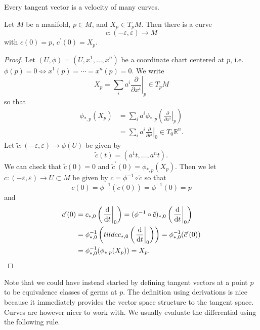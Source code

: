 Every tangent vector is a velocity of many curves.
\begin{lemma}
Let $M$ be a manifold, $p \in M$, and $X_p \in T_pM$.
Then there is a curve
$$
c: (-\varepsilon, \varepsilon) \to M
$$
with $c(0) = p$, $c^\prime(0) = X_p$.
\end{lemma}

\begin{proof}
Let $(U, \phi) = (U, x^1, \dots, x^n)$ be a coordinate chart centered
at $p$, i.e. $\phi(p) = 0 \iff x^1(p) = \cdots = x^n(p) = 0$. We write
$$
  X_p
= \sum_i
    a^i \left.\frac{\partial}{\partial x^i}\right|_p
\in T_p M
$$
so that
\begin{align*}
   \phi_{\ast, p}(X_p)
&= \sum_i
     a^i \phi_{\ast, p}
     \left(
       \left.\frac{\partial}{\partial x^i}\right|_p
     \right) \\
&= \sum_i
     a^i
     \left.\frac{\partial}{\partial r^i}\right|_0
\in T_0 \mathbb{R}^n.
\end{align*}
Let $\tilde{c} : (-\varepsilon, \varepsilon) \to \phi(U)$ be given by
$$
  \tilde{c}(t)
= (a^1 t, \dots, a^n t).
$$
We can check that $\tilde{c}(0) = 0$ and
$\tilde{c}^\prime(0) = \phi_{\ast, p}(X_p)$.
Then we let
$c : (-\varepsilon, \varepsilon) \to U \subset M$ be given by
$c = \phi^{-1} \circ \tilde{c}$ so that
$$
  c(0)
= \phi^{-1}(\tilde{c}(0))
= \phi^{-1}(0)
= p
$$
and
\begin{align*}
   c^\prime(0)
&= c_{\ast,0}
     \left(
       \left.\frac{\mathop{}\!\mathrm{d}}{\mathop{}\!\mathrm{d} t}\right|_0
     \right)
 = (\phi^{-1} \circ \tilde{c})_{\ast, 0}
     \left(
       \left.\frac{\mathop{}\!\mathrm{d}}{\mathop{}\!\mathrm{d} t}\right|_0
     \right) \\
&= \phi^{-1}_{\ast, 0}
     \left(
       tilde{c}_{\ast, 0}
       \left(
         \left.\frac{\mathop{}\!\mathrm{d}}{\mathop{}\!\mathrm{d} t}\right|_0
       \right)
     \right)
 = \phi^{-1}_{\ast, 0}(\tilde{c}^\prime(0)) \\
&= \phi^{-1}_{\ast, 0}(\phi_{\ast,p}(X_p))
 = X_p.
\end{align*}
\end{proof}

Note that we could have instead started by defining tangent vectors at
a point $p$ to be equivalence classes of germs at $p$. The definition
using derivations is nice because it immediately provides the vector
space structure to the tangent space. Curves are however nicer to work
with. We usually evaluate the differential using the following rule.

